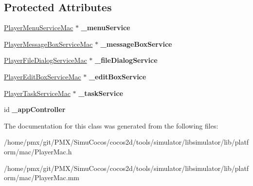 \subsection*{Protected Attributes}
\begin{DoxyCompactItemize}
\item 
\mbox{\label{classPlayerMac_a7facef41d5e2447caf33f15a4f535a19}} 
\hyperlink{classPlayerMenuServiceMac}{Player\+Menu\+Service\+Mac} $\ast$ {\bfseries \+\_\+menu\+Service}
\item 
\mbox{\label{classPlayerMac_a06ebc0ce7977d1f48ad484b1729f9a47}} 
\hyperlink{classPlayerMessageBoxServiceMac}{Player\+Message\+Box\+Service\+Mac} $\ast$ {\bfseries \+\_\+message\+Box\+Service}
\item 
\mbox{\label{classPlayerMac_a2998532c3bfcb43159a9b113d4864637}} 
\hyperlink{classPlayerFileDialogServiceMac}{Player\+File\+Dialog\+Service\+Mac} $\ast$ {\bfseries \+\_\+file\+Dialog\+Service}
\item 
\mbox{\label{classPlayerMac_a0df8a1763b34ca6334f6934bbaab73b5}} 
\hyperlink{classPlayerEditBoxServiceMac}{Player\+Edit\+Box\+Service\+Mac} $\ast$ {\bfseries \+\_\+edit\+Box\+Service}
\item 
\mbox{\label{classPlayerMac_adee5a91600106c948cd8538971bf2115}} 
\hyperlink{classPlayerTaskServiceMac}{Player\+Task\+Service\+Mac} $\ast$ {\bfseries \+\_\+task\+Service}
\item 
\mbox{\label{classPlayerMac_af2b2b31beba90f27082d8d9ee302a91b}} 
id {\bfseries \+\_\+app\+Controller}
\end{DoxyCompactItemize}


The documentation for this class was generated from the following files\+:\begin{DoxyCompactItemize}
\item 
/home/pmx/git/\+P\+M\+X/\+Simu\+Cocos/cocos2d/tools/simulator/libsimulator/lib/platform/mac/Player\+Mac.\+h\item 
/home/pmx/git/\+P\+M\+X/\+Simu\+Cocos/cocos2d/tools/simulator/libsimulator/lib/platform/mac/Player\+Mac.\+mm\end{DoxyCompactItemize}
